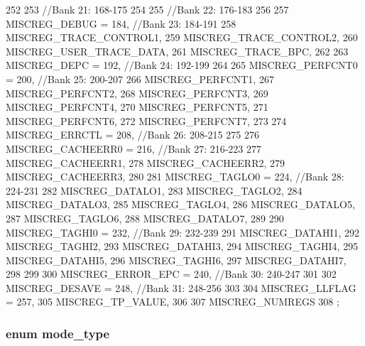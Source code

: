 \begin{DoxyCode}
{252 
253                        //Bank 21: 168-175
254 
255                        //Bank 22: 176-183
256 
257     MISCREG_DEBUG = 184,       //Bank 23: 184-191
258     MISCREG_TRACE_CONTROL1,
259     MISCREG_TRACE_CONTROL2,
260     MISCREG_USER_TRACE_DATA,
261     MISCREG_TRACE_BPC,
262 
263     MISCREG_DEPC = 192,        //Bank 24: 192-199
264 
265     MISCREG_PERFCNT0 = 200,    //Bank 25: 200-207
266     MISCREG_PERFCNT1,
267     MISCREG_PERFCNT2,
268     MISCREG_PERFCNT3,
269     MISCREG_PERFCNT4,
270     MISCREG_PERFCNT5,
271     MISCREG_PERFCNT6,
272     MISCREG_PERFCNT7,
273 
274     MISCREG_ERRCTL = 208,      //Bank 26: 208-215
275 
276     MISCREG_CACHEERR0 = 216,   //Bank 27: 216-223
277     MISCREG_CACHEERR1,
278     MISCREG_CACHEERR2,
279     MISCREG_CACHEERR3,
280 
281     MISCREG_TAGLO0 = 224,      //Bank 28: 224-231
282     MISCREG_DATALO1,
283     MISCREG_TAGLO2,
284     MISCREG_DATALO3,
285     MISCREG_TAGLO4,
286     MISCREG_DATALO5,
287     MISCREG_TAGLO6,
288     MISCREG_DATALO7,
289 
290     MISCREG_TAGHI0 = 232,      //Bank 29: 232-239
291     MISCREG_DATAHI1,
292     MISCREG_TAGHI2,
293     MISCREG_DATAHI3,
294     MISCREG_TAGHI4,
295     MISCREG_DATAHI5,
296     MISCREG_TAGHI6,
297     MISCREG_DATAHI7,
298 
299 
300     MISCREG_ERROR_EPC = 240,    //Bank 30: 240-247
301 
302     MISCREG_DESAVE = 248,       //Bank 31: 248-256
303 
304     MISCREG_LLFLAG = 257,
305     MISCREG_TP_VALUE,
306 
307     MISCREG_NUMREGS
308 };
\end{DoxyCode}
\hypertarget{namespaceMipsISA_a19269c193c0c4866cdc4e5abd433f9fc}{
\subsubsection[{mode\_\-type}]{\setlength{\rightskip}{0pt plus 5cm}enum {\bf mode\_\-type}}}
\label{namespaceMipsISA_a19269c193c0c4866cdc4e5abd433f9fc}
